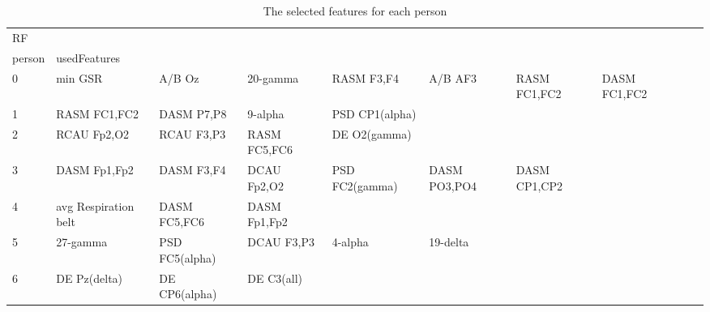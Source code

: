 \begin{landscape}
\begin{table}[]
\centering
\caption{The selected features for each person}
\begin{tabular}{l|llllllll}
RF       &                       &                       &                      &                         &                         &                      &                      &                       &                       &                    \\
person   & usedFeatures          &                       &                      &                         &                         &                      &                      &                       &                       &                    \\
0        & min GSR               & A/B Oz                & 20-gamma             & RASM F3,F4              & A/B AF3                 & RASM FC1,FC2         & DASM FC1,FC2         &                       &                       &                    \\
1        & RASM FC1,FC2          & DASM P7,P8            & 9-alpha              & PSD CP1(alpha)          &                         &                      &                      &                       &                       &                    \\
2        & RCAU Fp2,O2           & RCAU F3,P3            & RASM FC5,FC6         & DE O2(gamma)            &                         &                      &                      &                       &                       &                    \\
3        & DASM Fp1,Fp2          & DASM F3,F4            & DCAU Fp2,O2          & PSD FC2(gamma)          & DASM PO3,PO4            & DASM CP1,CP2         &                      &                       &                       &                    \\
4        & avg Respiration belt  & DASM FC5,FC6          & DASM Fp1,Fp2         &                         &                         &                      &                      &                       &                       &                    \\
5        & 27-gamma              & PSD FC5(alpha)        & DCAU F3,P3           & 4-alpha                 & 19-delta                &                      &                      &                       &                       &                    \\
6        & DE Pz(delta)          & DE CP6(alpha)         & DE C3(all)           &                         &                         &                      &                      &                       &                       &                    \\

\end{tabular}
\end{table}
\end{landscape}
